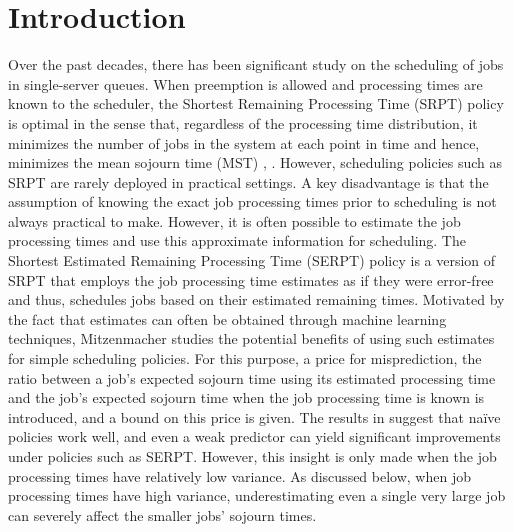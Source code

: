 \section{Introduction} \label{Introduction}



Over the past decades, there has been significant study on the scheduling of jobs in single-server queues. When preemption is allowed and processing times are known to the scheduler, the Shortest Remaining Processing Time (SRPT) policy is optimal in the sense that, regardless of the processing time distribution, it minimizes the number of jobs in the system at each point in time and hence, minimizes the mean sojourn time (MST) \cite{schrage1968letter}, \cite{schrage1966queue}. 
However, scheduling policies such as SRPT are rarely deployed in practical settings. A key disadvantage is that the assumption of knowing the exact job processing times prior to scheduling is not always practical to make. However, it is often possible to estimate the job processing times and use this approximate information for scheduling. The Shortest Estimated Remaining Processing Time (SERPT) policy is a version of SRPT that employs the job processing time estimates as if they were error-free and thus, schedules jobs based on their estimated remaining times. Motivated by the fact that estimates can often be obtained through machine learning techniques, Mitzenmacher \cite{mitzenmacher2019scheduling} studies the potential benefits of using such estimates for simple scheduling policies. For this purpose, a price for misprediction, the ratio between a job’s expected sojourn time using its estimated processing time and the job’s expected sojourn time when the job processing time is known is introduced, and a bound on this price is given. The results in \cite{mitzenmacher2019scheduling} suggest that naïve policies work well, and even a weak predictor can yield significant improvements under policies such as SERPT. However, this insight is only made when the job processing times have relatively low variance. As discussed below, when job processing times have high variance, underestimating even a single very large job can severely affect the smaller jobs' sojourn times. 

